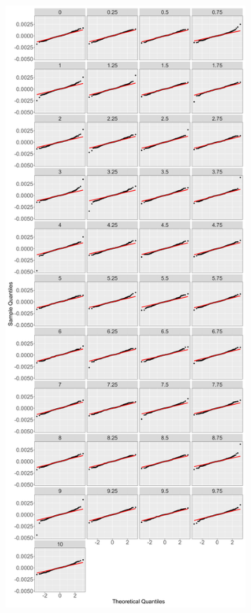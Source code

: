 \begin{figure}[!htbp]
\begin{subfigure}{0.49\textwidth}
        \includegraphics[width=\textwidth]{Figures/Model Checking/zero_coupon_yields_phase_3_HJM_2F_procedure_2_poly_model_qq_plot.png}

\end{subfigure}
\end{figure}
